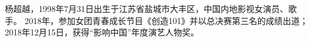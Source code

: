 
\begin{resume}

杨超越，1998年7月31日出生于江苏省盐城市大丰区，中国内地影视女演员、歌手。
2018年，参加女团青春成长节目《创造101》并以总决赛第三名的成绩出道；
2018年12月15日，获得“影响中国”年度演艺人物奖。

\end{resume}
